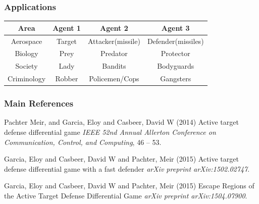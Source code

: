 \documentclass{beamer}
\begin{document}
\begin{frame}
\frametitle{Applications}
\begin{center}
\begin{tabular}{ |c||c|c|c| } 
\hline
Area & Agent 1 & Agent 2 & Agent 3 \\
 \hline
 \hline
 Aerospace & Target & Attacker(missile) & Defender(missiles)\\
 \hline 
 Biology & Prey & Predator & Protector \\
 \hline 
 Society & Lady & Bandits & Bodyguards\\ 
 \hline
 Criminology & Robber & Policemen/Cops & Gangsters \\ 
  \hline
\end{tabular}
\label{tableTAD}
\end{center}  
\end{frame}


\begin{frame}
\frametitle{Main References}
\footnotesize{
\begin{thebibliography}{99} %
 Pachter Meir, and Garcia, Eloy and Casbeer, David W (2014)
\newblock Active target defense differential game
\newblock \emph{IEEE 52nd Annual Allerton Conference on Communication, Control, and Computing}, 46 -- 53.

Garcia, Eloy and Casbeer, David W and Pachter, Meir (2015)
\newblock Active target defense differential game with a fast defender
\newblock \emph{arXiv preprint arXiv:1502.02747}.

Garcia, Eloy and Casbeer, David W and Pachter, Meir (2015)
\newblock Escape Regions of the Active Target Defense Differential Game
\newblock \emph{arXiv preprint arXiv:1504.07900}.

\end{thebibliography}
}
\end{frame}
\end{document}

